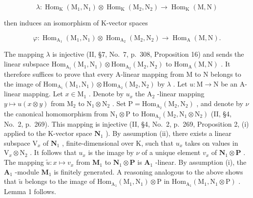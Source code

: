 \[
\lambda : \operatorname{Hom} _ {\mathrm{K}} (\mathrm{M} _ {1}, \mathrm{N} _ {1}) \otimes \operatorname{Hom} _ {\mathrm{K}} (\mathrm{M} _ {2}, \mathrm{N} _ {2}) \longrightarrow \operatorname{Hom} _ {\mathrm{K}} (\mathrm{M}, \mathrm{N})
\]

then induces an isomorphism of K-vector spaces

\[
\varphi : \operatorname{Hom} _ {\mathrm{A} _ {1}} (\mathrm{M} _ {1}, \mathrm{N} _ {1}) \otimes \operatorname{Hom} _ {\mathrm{A} _ {2}} (\mathrm{M} _ {2}, \mathrm{N} _ {2}) \longrightarrow \operatorname{Hom} _ {\mathrm{A}} (\mathrm{M}, \mathrm{N}).
\]

The mapping \(\lambda\) is injective (II, §7, No.~7, p.~308, Proposition 16) and sends the linear subspace \(\mathrm{Hom}_{\mathrm{A}_1}(\mathrm{M}_1,\mathrm{N}_1)\otimes \mathrm{Hom}_{\mathrm{A}_2}(\mathrm{M}_2,\mathrm{N}_2)\) to \(\mathrm{Hom}_{\mathrm{A}}(\mathrm{M},\mathrm{N})\) . It therefore suffices to prove that every A-linear mapping from M to N belongs to the image of \(\mathrm{Hom}_{\mathrm{A}_1}(\mathrm{M}_1,\mathrm{N}_1)\otimes \mathrm{Hom}_{\mathrm{A}_2}(\mathrm{M}_2,\mathrm{N}_2)\) by \(\lambda\) . Let \(u:\mathrm{M}\to \mathrm{N}\) be an A-linear mapping. Let \(x\in \mathrm{M}_1\) . Denote by \(u_{x}\) the \(\mathrm{A}_2\) -linear mapping \(y\mapsto u(x\otimes y)\) from \(\mathrm{M}_2\) to \(\mathrm{N}_1\otimes \mathrm{N}_2\) . Set \(\mathrm{P} = \mathrm{Hom}_{\mathrm{A}_2}(\mathrm{M}_2,\mathrm{N}_2)\) , and denote by \(\nu\) the canonical homomorphism from \(\mathrm{N}_1\otimes \mathrm{P}\) to \(\mathrm{Hom}_{\mathrm{A}_2}(\mathrm{M}_2,\mathrm{N}_1\otimes \mathrm{N}_2)\) (II, §4, No.~2, p.~269). This mapping is injective (II, §4, No.~2, p.~269, Proposition 2, (i) applied to the K-vector space \(\mathbf{N}_1\) ). By assumption (ii), there exists a linear subspace \(\mathrm{V}_x\) of \(\mathbf{N}_1\) , finite-dimensional over K, such that \(u_{x}\) takes on values in \(\mathrm{V}_x\otimes \mathrm{N}_2\) . It follows that \(u_{x}\) is the image by \(\nu\) of a unique element \(v_{x}\) of \(\mathbf{N}_1\otimes \mathbf{P}\) . The mapping \(\widetilde{u}:x\mapsto v_x\) from \(\mathbf{M}_1\) to \(\mathbf{N}_1\otimes \mathbf{P}\) is \(\mathbf{A}_1\) -linear. By assumption (i), the \(\mathbf{A}_1\) -module \(\mathbf{M}_1\) is finitely generated. A reasoning analogous to the above shows that \(\widetilde{u}\) belongs to the image of \(\mathrm{Hom}_{\mathrm{A}_1}(\mathrm{M}_1,\mathrm{N}_1)\otimes \mathrm{P}\) in \(\mathrm{Hom}_{\mathrm{A}_1}(\mathrm{M}_1,\mathrm{N}_1\otimes \mathrm{P})\) . Lemma 1 follows.

